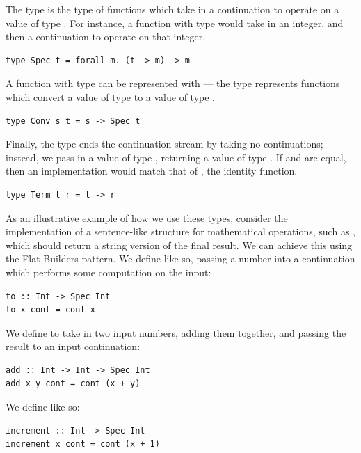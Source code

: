 The type  is the type of functions which take in a continuation to operate on a value of type . For instance, a function with type  would take in an integer, and then a continuation to operate on that integer.

\begin{lstlisting}
type Spec t = forall m. (t -> m) -> m
\end{lstlisting}

A function with type  can be represented with  --- the  type represents functions which convert a value of type  to a value of type .

\begin{lstlisting}
type Conv s t = s -> Spec t
\end{lstlisting}

Finally, the  type ends the continuation stream by taking no continuations; instead, we pass in a value of type , returning a value of type . If  and  are equal, then an implementation would match that of , the identity function.

\begin{lstlisting}
type Term t r = t -> r
\end{lstlisting}

As an illustrative example of how we use these types, consider the implementation of a sentence-like structure for mathematical operations, such as , which should return a string version of the final result. We can achieve this using the Flat Builders pattern. We define  like so, passing a number into a continuation which performs some computation on the input:

\begin{lstlisting}
to :: Int -> Spec Int
to x cont = cont x
\end{lstlisting}

We define  to take in two input numbers, adding them together, and passing the result to an input continuation:

\begin{lstlisting}
add :: Int -> Int -> Spec Int
add x y cont = cont (x + y)
\end{lstlisting}

We define  like so:

\begin{lstlisting}
increment :: Int -> Spec Int
increment x cont = cont (x + 1)
\end{lstlisting}

